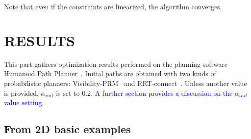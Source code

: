\documentclass{tADR2e}
\begin{document}
Note that even if the constraints are linearized, the algorithm converges.


\section{RESULTS}

This part gathers optimization results performed on the planning software 
Humanoid Path Planner~\cite{hpp}. Initial paths are obtained with two 
kinds of probabilistic planners: Visibility-PRM~\cite{visibility-prm} and 
RRT-connect~\cite{rrt-connect}. Unless another value is provided, $\alpha_{init}$ 
is set to 0.2. \textcolor{blue}{A further section provides a discussion on the $\alpha_{init}$ value setting.}

\subsection{From 2D basic examples}
\end{document}
